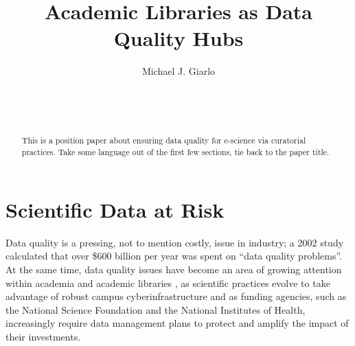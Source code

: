 \documentclass{acm_proc_article-sp}
\begin{document}
\title{Academic Libraries as Data Quality Hubs}


 \author{
  \alignauthor Michael J. Giarlo\\
  \\
  \\
  \\
   }
\maketitle

\begin{abstract}
  This is a position paper about ensuring data quality for e-science via
  curatorial practices.
  Take some language out of the first few sections, tie back to the
  paper title.
\end{abstract}




\section{Scientific Data at Risk}
Data quality is a pressing, not to mention costly, issue in industry;
a 2002 study\cite{russom:case} calculated that over \$600 billion per
year was spent on ``data quality problems''\cite{eckerson:bottomline}.
At the same time, data quality issues have become an area of growing
attention within academia and academic libraries
\cite{heidorn:libraries,arl:stewardship,ogburn:imperative,jisc:deluge},
as scientific practices evolve to take advantage of robust campus
cyberinfrastructure and as funding agencies, such as the National
Science Foundation and the National Institutes of Health, increasingly
require data management plans to protect and amplify the impact of
their investments.
\end{document}
